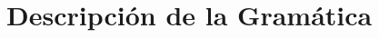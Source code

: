 \documentclass[10pt, a4paper]{article}
\begin{document}
	\maketitle
	\tableofcontents
	
	\newpage
	\section{Descripción de la Gramática}
	
	
	
\end{document}
